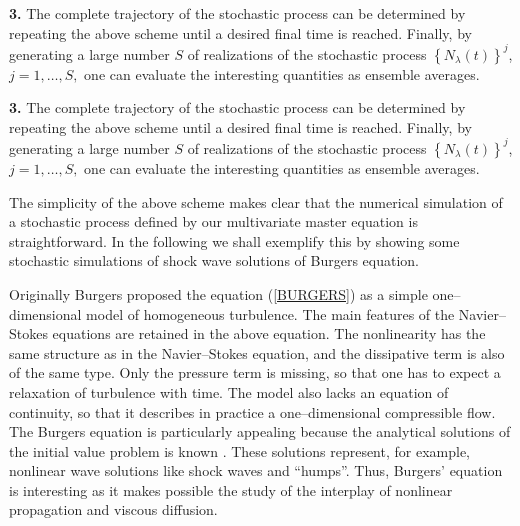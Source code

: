 {\bf{3.}} The complete trajectory of the stochastic process can
be determined by repeating the above scheme until a desired final time
is reached. Finally, by generating a large number $S$
of realizations of the stochastic process $\left\{ N_{\lambda}(t) \right\}^j$,
$j=1, \ldots , S,$ one can evaluate the interesting quantities as
ensemble averages.

{\bf{3.}} The complete trajectory of the stochastic process can
be determined by repeating the above scheme until a desired final time
is reached. Finally, by generating a large number $S$
of realizations of the stochastic process $\left\{ N_{\lambda}(t) \right\}^j$,
$j=1, \ldots , S,$ one can evaluate the interesting quantities as
ensemble averages.

The simplicity of the above scheme makes clear that the numerical 
simulation of a stochastic process defined by our multivariate master equation
is straightforward. In the following we shall exemplify this by showing
some stochastic simulations of shock wave solutions of Burgers equation.

Originally Burgers proposed the equation (\ref{BURGERS})
as a simple one--dimensional model of homogeneous turbulence. The
main
features of the Navier--Stokes equations are retained in the above
equation.
The nonlinearity has the same structure as in the Navier--Stokes
equation,
and the dissipative term is also of the same type.  Only the
pressure term
is missing, so that one has to expect a relaxation of turbulence
with time.
The model also lacks an equation of continuity, so that it
describes in
practice a one--dimensional compressible flow. The Burgers equation
is
particularly appealing because the analytical solutions of the
initial value
problem is known \cite{WHITHAM}. These solutions represent,
for example, nonlinear wave solutions like shock waves and ``humps''.
Thus, Burgers' equation is interesting as it makes possible the study
of
the interplay of nonlinear propagation and viscous diffusion.
